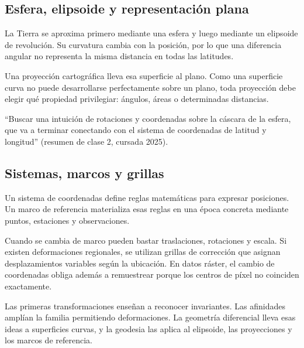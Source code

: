 \subsection{Esfera, elipsoide y representación plana}\label{sec:esfera-primera}

{\small\vspace{1mm}\par}
{\small\vspace{1mm}\par}


La Tierra se aproxima primero mediante una esfera y luego mediante un elipsoide de revolución.
Su curvatura cambia con la posición, por lo que una diferencia angular no representa la misma
distancia en todas las latitudes.

Una proyección cartográfica lleva esa superficie al plano. Como una superficie curva no puede
desarrollarse perfectamente sobre un plano, toda proyección debe elegir qué propiedad
privilegiar: ángulos, áreas o determinadas distancias.

\begin{idea}
``Buscar una intuición de rotaciones y coordenadas sobre la cáscara de la esfera, que va
a terminar conectando con el sistema de coordenadas de latitud y longitud'' (resumen de clase 2, cursada 2025).
\end{idea}

\subsection{Sistemas, marcos y grillas}\label{sec:sistemas-marcos}

Un sistema de coordenadas define reglas matemáticas para expresar posiciones. Un marco de
referencia materializa esas reglas en una época concreta mediante puntos, estaciones y
observaciones.

Cuando se cambia de marco pueden bastar traslaciones, rotaciones y escala. Si existen
deformaciones regionales, se utilizan grillas de corrección que asignan desplazamientos
variables según la ubicación. En datos ráster, el cambio de coordenadas obliga además a
remuestrear porque los centros de píxel no coinciden exactamente.

\begin{resultado}
Las primeras transformaciones enseñan a reconocer invariantes. Las afinidades amplían la
familia permitiendo deformaciones. La geometría diferencial lleva esas ideas a superficies
curvas, y la geodesia las aplica al elipsoide, las proyecciones y los marcos de referencia.
\end{resultado}

